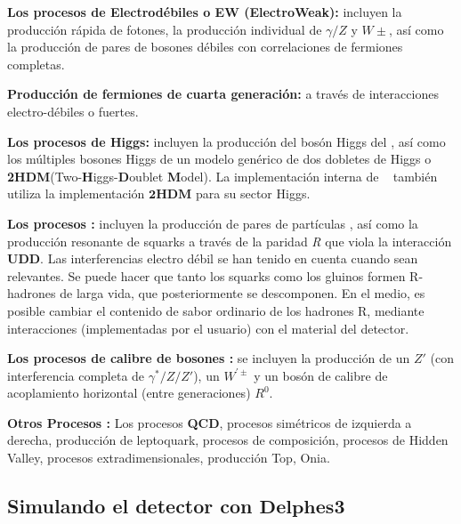 \begin{itemize_f}
\item \textbf{Los procesos de Electrodébiles o \textbf{EW} (\textbf{E}lectro\textbf{W}eak):} incluyen la producción rápida de fotones, la producción individual de $\gamma/Z$ y $W\pm$, así como la producción de pares de bosones débiles con correlaciones de fermiones completas.%
\item \textbf{Producción de fermiones de cuarta generación:} a través de interacciones electro-débiles o fuertes.
\item \textbf{Los procesos de Higgs:} incluyen la producción del bosón Higgs del \ME, así como los múltiples bosones Higgs de un modelo genérico de dos dobletes de Higgs o \textbf{2HDM}(Two-\textbf{H}iggs-\textbf{D}oublet \textbf{M}odel). %
La implementación interna de \SUSY ~ también utiliza la implementación $\mathbf{2HDM}$ para su sector Higgs.
\item \textbf{Los procesos \SUSY:} incluyen la producción de pares de partículas \SUSY, así como la producción resonante de squarks a través de la paridad \textit{R} que viola la interacción \textbf{UDD}. Las interferencias electro débil se han tenido en cuenta cuando sean relevantes. Se puede hacer que tanto los squarks como los gluinos formen R-hadrones de larga vida, que posteriormente se descomponen. En el medio, es posible cambiar el contenido de sabor ordinario de los hadrones R, mediante interacciones (implementadas por el usuario) con el material del detector.
\item \textbf{Los procesos de calibre de bosones :} se incluyen la producción de un $Z'$ (con interferencia completa de $\gamma^*/Z/Z'$), un $W^{'\pm}$ y un bosón de calibre de acoplamiento horizontal (entre generaciones) $R^0$.
\item[-] \textbf{Otros Procesos :} Los procesos \textbf{QCD}, procesos simétricos de izquierda a derecha, producción de leptoquark, procesos de composición, procesos de Hidden Valley, procesos extradimensionales, producción Top, Onia.
\end{itemize_f}





\subsection{Simulando el detector con $\mathbf{Delphes 3}$}\label{C_delphes}



